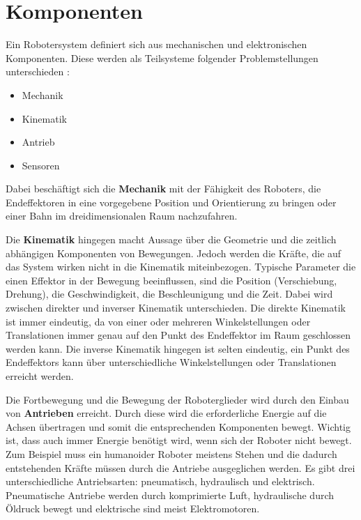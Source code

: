 \section{Komponenten}\label{Komponenten}
Ein Robotersystem definiert sich aus mechanischen und elektronischen Komponenten. Diese werden als Teilsysteme folgender Problemstellungen unterschieden \cite{Haun2007}:
\begin{itemize}
\item Mechanik
\item Kinematik
\item Antrieb
\item Sensoren
\end{itemize}
Dabei beschäftigt sich die \textbf{Mechanik} mit der Fähigkeit des Roboters, die Endeffektoren in eine vorgegebene Position und Orientierung zu bringen oder einer Bahn im dreidimensionalen Raum nachzufahren.

Die \textbf{Kinematik} hingegen macht Aussage über die Geometrie und die zeitlich abhängigen Komponenten von Bewegungen. Jedoch werden die Kräfte, die auf das System wirken nicht in die Kinematik miteinbezogen. Typische Parameter die einen Effektor in der Bewegung beeinflussen, sind die Position (Verschiebung, Drehung), die Geschwindigkeit, die Beschleunigung und die Zeit. Dabei wird zwischen direkter und inverser Kinematik unterschieden. Die direkte Kinematik ist immer eindeutig, da von einer oder mehreren Winkelstellungen oder Translationen immer genau auf den Punkt des Endeffektor im Raum geschlossen werden kann. Die inverse Kinematik hingegen ist selten eindeutig, ein Punkt des Endeffektors kann über unterschiedliche Winkelstellungen oder Translationen erreicht werden. 

Die Fortbewegung und die Bewegung der Roboterglieder wird durch den Einbau von \textbf{Antrieben} erreicht. Durch diese wird die erforderliche Energie auf die Achsen übertragen und somit die entsprechenden Komponenten bewegt. Wichtig ist, dass auch immer Energie benötigt wird, wenn sich der Roboter nicht bewegt. Zum Beispiel muss ein humanoider Roboter meistens Stehen und die dadurch entstehenden Kräfte müssen durch die Antriebe ausgeglichen werden. Es gibt drei unterschiedliche Antriebsarten: pneumatisch, hydraulisch und elektrisch. Pneumatische Antriebe werden durch komprimierte Luft, hydraulische durch Öldruck bewegt und elektrische sind meist Elektromotoren. 

